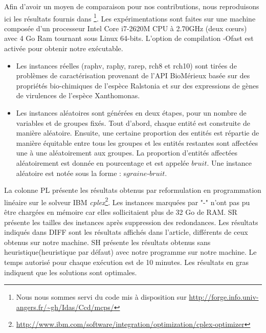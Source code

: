 Afin d'avoir un moyen de comparaison pour nos contributions, nous reproduisons ici les résultats fournis dans \cite{Chhel2013}\footnote{Nous nous sommes servi du code mis à disposition sur \url{http://forge.info.univ-angers.fr/~gh/Idas/Ccd/mcps/}}. Les expérimentations sont faites sur une machine composée d'un processeur Intel Core i7-2620M CPU à 2.70GHz (deux cœurs) avec 4 Go Ram tournant sous Linux 64-bits. L'option de compilation -Ofast est activée pour obtenir notre exécutable.
\begin{itemize}
\item Les instances réelles (raphv, raphy, rarep, rch8 et rch10) sont tirées de problèmes de caractérisation provenant de l'API BioMérieux basée sur des propriétés bio-chimiques de l'espèce Ralstonia et sur des expressions de gènes de virulences de l'espèce Xanthomonas.
\item Les instances aléatoires sont générées en deux étapes, pour un nombre de variables et de groupes fixés. Tout d'abord, chaque entité est construite de manière aléatoire. Ensuite, une certaine proportion des entités est répartie de manière équitable entre tous les groupes et les entités
restantes sont affectées une à une aléatoirement aux groupes. La proportion
d'entités affectées aléatoirement est donnée en pourcentage et est appelée
$bruit$. Une instance aléatoire est notée sous la forme : s$graine$-$bruit$.
\end{itemize}
La colonne PL présente les résultats obtenus par reformulation en programmation linéaire sur le solveur IBM \textit{cplex}\footnote{\url{http://www.ibm.com/software/integration/optimization/cplex-optimizer}}. Les instances marquées par "-" n'ont pas pu être chargées en mémoire car elles sollicitaient plus de 32 Go de RAM. SR présente les tailles des instances après suppression des redondances. Les résultats indiqués dans DIFF sont les résultats affichés dans l'article, différents de ceux obtenus sur notre machine. SH présente les résultats obtenus sans heuristique(heuristique par défaut) avec notre programme sur notre machine. Le temps autorisé pour chaque exécution est de 10 minutes. Les résultats en gras indiquent que les solutions sont optimales.
